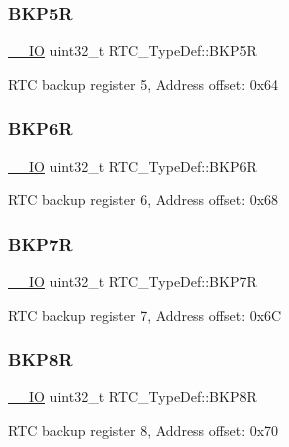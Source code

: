 \subsubsection{\texorpdfstring{BKP5R}{BKP5R}}
{\footnotesize\ttfamily \mbox{\hyperlink{core__sc300_8h_aec43007d9998a0a0e01faede4133d6be}{\+\_\+\+\_\+\+IO}} uint32\+\_\+t R\+T\+C\+\_\+\+Type\+Def\+::\+B\+K\+P5R}

R\+TC backup register 5, Address offset\+: 0x64 \mbox{\label{struct_r_t_c___type_def_a766e2071c5826e3a299ae1cd5bbf06f7}} 
\subsubsection{\texorpdfstring{BKP6R}{BKP6R}}
{\footnotesize\ttfamily \mbox{\hyperlink{core__sc300_8h_aec43007d9998a0a0e01faede4133d6be}{\+\_\+\+\_\+\+IO}} uint32\+\_\+t R\+T\+C\+\_\+\+Type\+Def\+::\+B\+K\+P6R}

R\+TC backup register 6, Address offset\+: 0x68 \mbox{\label{struct_r_t_c___type_def_a9934af6ae6b3f5660204d48ceb2f3192}} 
\subsubsection{\texorpdfstring{BKP7R}{BKP7R}}
{\footnotesize\ttfamily \mbox{\hyperlink{core__sc300_8h_aec43007d9998a0a0e01faede4133d6be}{\+\_\+\+\_\+\+IO}} uint32\+\_\+t R\+T\+C\+\_\+\+Type\+Def\+::\+B\+K\+P7R}

R\+TC backup register 7, Address offset\+: 0x6C \mbox{\label{struct_r_t_c___type_def_a0e7fca11f1c953270ee0ee6028860add}} 
\subsubsection{\texorpdfstring{BKP8R}{BKP8R}}
{\footnotesize\ttfamily \mbox{\hyperlink{core__sc300_8h_aec43007d9998a0a0e01faede4133d6be}{\+\_\+\+\_\+\+IO}} uint32\+\_\+t R\+T\+C\+\_\+\+Type\+Def\+::\+B\+K\+P8R}

R\+TC backup register 8, Address offset\+: 0x70 \mbox{\label{struct_r_t_c___type_def_abadf1ac26350bf00575428be6a05708b}} 
